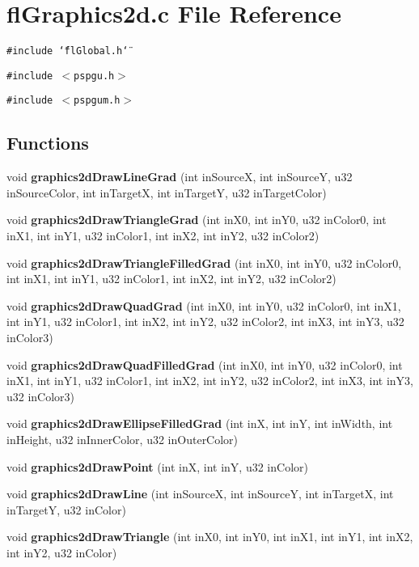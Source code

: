 \section{fl\-Graphics2d.c File Reference}
\label{flGraphics2d_8c}
{\tt \#include \char`\"{}fl\-Global.h\char`\"{}}\par
{\tt \#include $<$pspgu.h$>$}\par
{\tt \#include $<$pspgum.h$>$}\par
\subsection*{Functions}
\begin{CompactItemize}
\item 
void {\bf graphics2d\-Draw\-Line\-Grad} (int in\-Source\-X, int in\-Source\-Y, u32 in\-Source\-Color, int in\-Target\-X, int in\-Target\-Y, u32 in\-Target\-Color)
\item 
void {\bf graphics2d\-Draw\-Triangle\-Grad} (int in\-X0, int in\-Y0, u32 in\-Color0, int in\-X1, int in\-Y1, u32 in\-Color1, int in\-X2, int in\-Y2, u32 in\-Color2)
\item 
void {\bf graphics2d\-Draw\-Triangle\-Filled\-Grad} (int in\-X0, int in\-Y0, u32 in\-Color0, int in\-X1, int in\-Y1, u32 in\-Color1, int in\-X2, int in\-Y2, u32 in\-Color2)
\item 
void {\bf graphics2d\-Draw\-Quad\-Grad} (int in\-X0, int in\-Y0, u32 in\-Color0, int in\-X1, int in\-Y1, u32 in\-Color1, int in\-X2, int in\-Y2, u32 in\-Color2, int in\-X3, int in\-Y3, u32 in\-Color3)
\item 
void {\bf graphics2d\-Draw\-Quad\-Filled\-Grad} (int in\-X0, int in\-Y0, u32 in\-Color0, int in\-X1, int in\-Y1, u32 in\-Color1, int in\-X2, int in\-Y2, u32 in\-Color2, int in\-X3, int in\-Y3, u32 in\-Color3)
\item 
void {\bf graphics2d\-Draw\-Ellipse\-Filled\-Grad} (int in\-X, int in\-Y, int in\-Width, int in\-Height, u32 in\-Inner\-Color, u32 in\-Outer\-Color)
\item 
void {\bf graphics2d\-Draw\-Point} (int in\-X, int in\-Y, u32 in\-Color)
\item 
void {\bf graphics2d\-Draw\-Line} (int in\-Source\-X, int in\-Source\-Y, int in\-Target\-X, int in\-Target\-Y, u32 in\-Color)
\item 
void {\bf graphics2d\-Draw\-Triangle} (int in\-X0, int in\-Y0, int in\-X1, int in\-Y1, int in\-X2, int in\-Y2, u32 in\-Color)
\item 

\end{CompactItemize}

